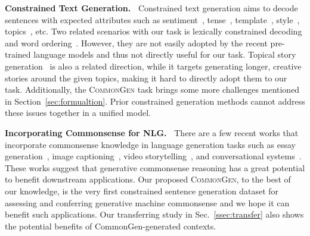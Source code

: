\documentclass[11pt,a4paper]{article}
\begin{document}
	\smallskip
	\noindent
	\textbf{Constrained Text Generation.~}
Constrained text generation aims to decode sentences with expected attributes such as sentiment~\cite{Luo2019TowardsFT, Hu2017TowardCG}, tense~\cite{Hu2017TowardCG}, template~\cite{Zhu2019TextI, j-kurisinkel-chen-2019-set}, style~\cite{fu2018style, Luo2019ADR, Li2018DeleteRG}, topics~\cite{Feng2018TopictoEssayGW}, etc.
	Two related scenarios with our task is lexically constrained decoding and word ordering~\cite{Zhang2015DiscriminativeSW, Hasler2018NeuralMT, Dinu2019TrainingNM, Hokamp2017LexicallyCD, puduppully-etal-2017-transition,Miao2018CGMHCS}. 
	However, they are not easily adopted by the recent pre-trained language models and thus not directly useful for our task.
Topical story generation~\cite{Fan2018HierarchicalNS, yao2019plan} is also a related direction, while it targets generating longer, creative stories around the given topics, making it hard to directly adopt them to our task.
	Additionally, the \textsc{CommonGen} task brings some more challenges mentioned in Section~\ref{sec:formualtion}.
	Prior constrained generation methods cannot address these issues together in a unified model.


	\smallskip
	\noindent
	\textbf{Incorporating Commonsense for NLG.~}
There are a few recent works that incorporate commonsense knowledge in language generation tasks such as essay generation~\cite{Guan2018StoryEG, Yang2019EnhancingTG}, image captioning~\cite{DBLP:conf/cvpr/LuYBP18}, video storytelling~\cite{Yang2019KnowledgeableSA}, and conversational systems~\cite{Zhang2019ConversationGW}.
	These works suggest that generative commonsense reasoning has a great potential to benefit downstream applications.
    Our proposed \textsc{CommonGen}, to the best of our knowledge, is the very first constrained sentence generation dataset for assessing and conferring generative machine commonsense and we hope it can benefit such applications.
    Our transferring study in Sec.~\ref{ssec:transfer} also shows the potential benefits of CommonGen-generated contexts.

 	
\end{document}
